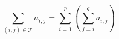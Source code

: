 \begin{displaymath}
 \sum_{(i,j)\in \mathcal T}a_{i,j} =\sum_{i=1}^{p}\left( \sum_{j=i}^{q} a_{i,j}\right)
\end{displaymath}
